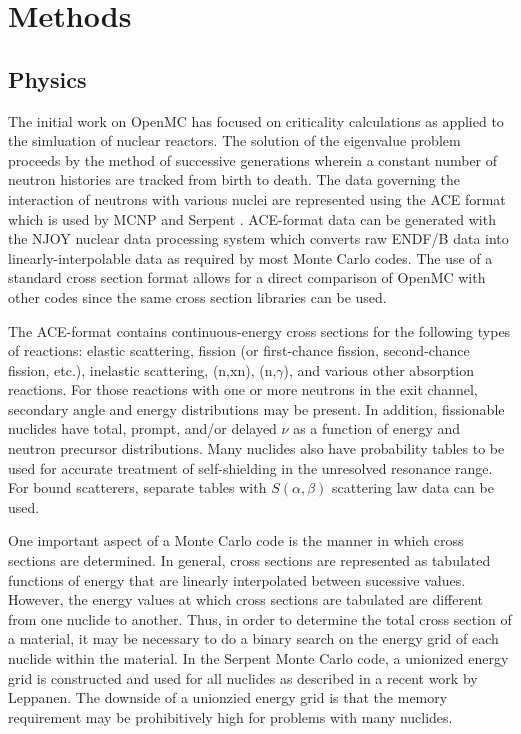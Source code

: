 \documentclass{elsarticle}
\begin{document}
\section{Methods}

\subsection{Physics}

The initial work on OpenMC has focused on criticality calculations as applied to
the simluation of nuclear reactors. The solution of the eigenvalue problem
proceeds by the method of successive generations \cite{lieberoth} wherein a
constant number of neutron histories are tracked from birth to death. The data
governing the interaction of neutrons with various nuclei are represented using
the ACE format \cite{ace-format} which is used by MCNP \cite{mcnp} and Serpent
\cite{serpent}. ACE-format data can be generated with the NJOY nuclear data
processing system which converts raw ENDF/B data into linearly-interpolable data
as required by most Monte Carlo codes. The use of a standard cross section
format allows for a direct comparison of OpenMC with other codes since the same
cross section libraries can be used.

The ACE-format contains continuous-energy cross sections for the following types
of reactions: elastic scattering, fission (or first-chance fission,
second-chance fission, etc.), inelastic scattering, (n,xn), (n,$\gamma$), and
various other absorption reactions. For those reactions with one or more
neutrons in the exit channel, secondary angle and energy distributions may be
present. In addition, fissionable nuclides have total, prompt, and/or delayed
$\nu$ as a function of energy and neutron precursor distributions. Many nuclides
also have probability tables to be used for accurate treatment of self-shielding
in the unresolved resonance range. For bound scatterers, separate tables with
$S(\alpha,\beta)$ scattering law data can be used.

One important aspect of a Monte Carlo code is the manner in which cross sections
are determined. In general, cross sections are represented as tabulated
functions of energy that are linearly interpolated between sucessive
values. However, the energy values at which cross sections are tabulated are
different from one nuclide to another. Thus, in order to determine the total
cross section of a material, it may be necessary to do a binary search on the
energy grid of each nuclide within the material. In the Serpent Monte Carlo
code, a unionized energy grid is constructed and used for all nuclides as
described in a recent work by Leppanen. The downside of a unionzied energy grid
is that the memory requirement may be prohibitively high for problems with many
nuclides. 
\end{document}
